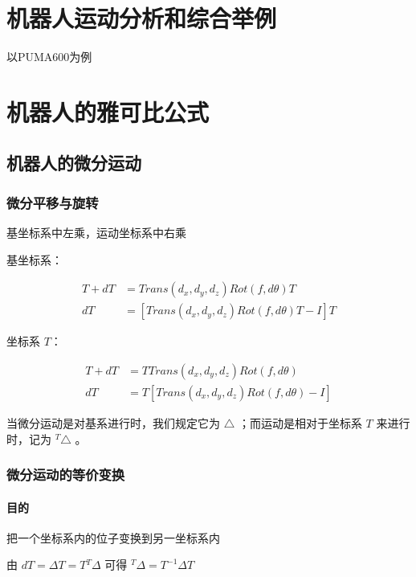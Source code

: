 \documentclass[11pt]{book}
\begin{document}
\section{机器人运动分析和综合举例}

以PUMA600为例

\section{机器人的雅可比公式}

\subsection{机器人的微分运动}

\subsubsection{微分平移与旋转}%
\label{ssub:wei_fen_ping_yi_yu_xuan_zhuan_}

基坐标系中左乘，运动坐标系中右乘

基坐标系：

$$
\begin{array}{ll}
	T + dT &= Trans(d_x, d_y, d_z)Rot(f,d \theta)T \\
	dT &= [Trans(d_x, d_y, d_z)Rot(f,d \theta)T - I]T
\end{array}
$$

坐标系 ${T}$：

$$
\begin{array}{ll}
	T + dT &= TTrans(d_x, d_y, d_z)Rot(f, d \theta) \\
	dT &= T[Trans(d_x, d_y, d_z)Rot(f, d \theta) - I]
\end{array}
$$

	当微分运动是对基系进行时，我们规定它为 $\triangle$ ；而运动是相对于坐标系 ${T}$ 来进行时，记为 ${}^T \triangle$ 。


\subsubsection{微分运动的等价变换}%
\label{ssub:wei_fen_yun_dong_de_deng_jie_bian_huan_}

\paragraph{目的}%
\label{par:mu_de_}

把一个坐标系内的位子变换到另一坐标系内

由 $dT = \Delta T = T {}^T \Delta$ 可得 ${}^T \Delta = T^{-1} \Delta T$
\end{document}
